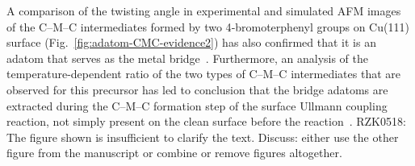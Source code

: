 \documentclass[%
 reprint,
 amsmath,amssymb,
 aps,
prb,
floatfix,
]{revtex4-2}
\newcommand{\comm}{\color{Purple}} %
\begin{document}
{%

A comparison of the twisting angle in experimental and simulated AFM images of the C--M--C intermediates formed by two 4‐bromoterphenyl groups on Cu(111) surface (Fig.~\ref{fig:adatom-CMC-evidence2}) has also confirmed that it is an adatom that serves as the metal bridge~\cite{acsnano2019}. Furthermore, an analysis of the temperature-dependent ratio of the two types of C--M--C intermediates that are observed for this precursor has led to conclusion that the bridge adatoms are extracted during the C--M--C formation step of the surface Ullmann coupling reaction, not simply present on the clean surface before the reaction~\cite{acsnano2019}. {\comm RZK0518: The figure shown is insufficient to clarify the text. Discuss: either use the other figure from the manuscript or combine or remove figures altogether.}

}

\end{document}
